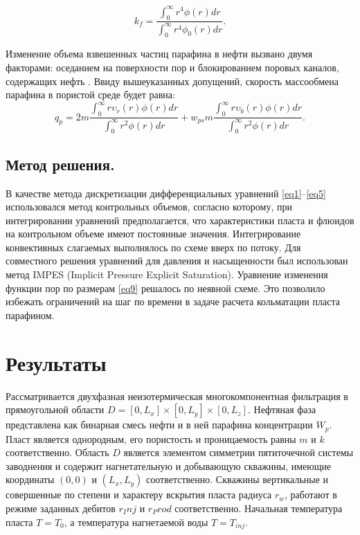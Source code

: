 \documentclass[12pt,twoside,a4paper]{uz_ku}
\begin{document}
\begin{equation}\label{eq11}
k_f = \frac
{ \int_{0}^{\infty} r^4 \phi (r) dr}
{ \int_{0}^{\infty} r^4 \phi_0 (r) dr}.
\end{equation}

	Изменение объема взвешенных частиц парафина в нефти вызвано двумя факторами: оседанием на поверхности пор и блокированием поровых каналов, содержащих нефть \cite{3}. Ввиду вышеуказанных допущений, скорость массообмена парафина в пористой среде будет равна:
\begin{equation}\label{eq12}
q_p =
2 m \frac{ \int_{0}^{\infty} r \upsilon_r(r) \phi (r) dr}{ \int_{0}^{\infty} r^2 \phi(r) dr} + 
w_{ps} m  \frac{ \int_{0}^{\infty} r \upsilon_b(r) \phi (r) dr}{ \int_{0}^{\infty} r^2 \phi(r) dr}.
\end{equation}


\subsection{Метод решения. }
	В качестве метода дискретизации дифференциальных уравнений \eqref{eq1}--\eqref{eq5} использовался метод контрольных объемов, согласно которому, при интегрировании уравнений предполагается, что характеристики пласта и флюидов на контрольном объеме имеют постоянные значения. Интегрирование конвективных слагаемых выполнялось по схеме вверх по потоку. Для совместного решения уравнений для давления и насыщенности был использован метод IMPES (Implicit Pressure Explicit Saturation). Уравнение изменения функции пор по размерам \eqref{eq9} решалось по неявной схеме. Это позволило избежать ограничений на шаг по времени в задаче расчета кольматации пласта парафином.


\section{Результаты}
	Рассматривается двухфазная неизотермическая многокомпонентная фильтрация в прямоугольной области $D = [0, L_x] \times [0, L_y] \times [0, L_z]$. Нефтяная фаза представлена как бинарная смесь нефти и в ней парафина концентрации $W_p$. Пласт является однородным, его пористость и проницаемость равны $m$ и $k$ соответственно. Область $D$ является элементом симметрии пятиточечной системы заводнения и содержит нагнетательную и добывающую скважины, имеющие координаты $(0, 0)$ и $(L_x, L_y)$ соответственно. Скважины вертикальные и совершенные по степени и характеру вскрытия пласта радиуса $r_w$, работают в режиме заданных дебитов $r_Inj$ и $r_Prod$ соответственно. Начальная температура пласта $T=T_0$, а температура нагнетаемой воды $T=T_{inj}$.
\end{document}
